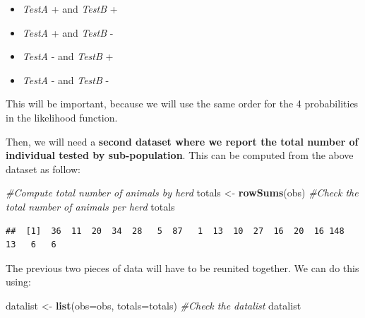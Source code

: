 \documentclass[
]{book}
\newenvironment{Shaded}{\begin{snugshade}}{\end{snugshade}}
\newcommand{\AttributeTok}[1]{\textcolor[rgb]{0.13,0.29,0.53}{#1}}
\newcommand{\CommentTok}[1]{\textcolor[rgb]{0.56,0.35,0.01}{\textit{#1}}}
\newcommand{\FunctionTok}[1]{\textcolor[rgb]{0.13,0.29,0.53}{\textbf{#1}}}
\newcommand{\NormalTok}[1]{#1}
\newcommand{\OtherTok}[1]{\textcolor[rgb]{0.56,0.35,0.01}{#1}}
\providecommand{\tightlist}{%
  \setlength{\itemsep}{0pt}\setlength{\parskip}{0pt}}
\begin{document}
\begin{itemize}
\tightlist
\item
  \emph{TestA} + and \emph{TestB} +\\
\item
  \emph{TestA} + and \emph{TestB} -\\
\item
  \emph{TestA} - and \emph{TestB} +\\
\item
  \emph{TestA} - and \emph{TestB} -
\end{itemize}

This will be important, because we will use the same order for the 4 probabilities in the likelihood function.

Then, we will need a \textbf{second dataset where we report the total number of individual tested by sub-population}. This can be computed from the above dataset as follow:

\begin{Shaded}
\begin{Highlighting}[]
\CommentTok{\#Compute total number of animals by herd}
\NormalTok{totals }\OtherTok{\textless{}{-}} \FunctionTok{rowSums}\NormalTok{(obs)}
\CommentTok{\#Check the total number of animals per herd}
\NormalTok{totals}
\end{Highlighting}
\end{Shaded}

\begin{verbatim}
##  [1]  36  11  20  34  28   5  87   1  13  10  27  16  20  16 148  13   6   6
\end{verbatim}

The previous two pieces of data will have to be reunited together. We can do this using:

\begin{Shaded}
\begin{Highlighting}[]
\NormalTok{datalist }\OtherTok{\textless{}{-}} \FunctionTok{list}\NormalTok{(}\AttributeTok{obs=}\NormalTok{obs, }\AttributeTok{totals=}\NormalTok{totals)}
\CommentTok{\#Check the datalist}
\NormalTok{datalist}
\end{Highlighting}
\end{Shaded}
\end{document}
